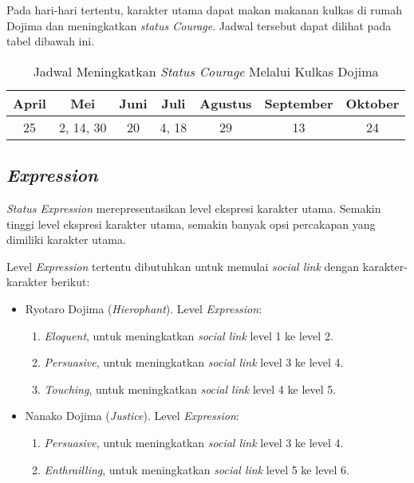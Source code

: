 Pada hari-hari tertentu, karakter utama dapat makan makanan kulkas di rumah Dojima dan meningkatkan \textit{status Courage}. Jadwal tersebut dapat dilihat pada tabel dibawah ini.
\begin{table}[htb]
    \begin{center}
        \begin{tabular}{ | c | c | c | c | c | c | c | }
            \hline
            April & Mei       & Juni & Juli  & Agustus & September & Oktober \\
            \hline
            25    & 2, 14, 30 & 20   & 4, 18 & 29      & 13        & 24      \\
            \hline
        \end{tabular}
    \end{center}
    \caption{\label{jadwal1}Jadwal Meningkatkan \textit{Status Courage} Melalui Kulkas Dojima}
\end{table}

\subsection{\textit{Expression}}
\textit{Status Expression} merepresentasikan level ekspresi karakter utama. Semakin tinggi level ekspresi karakter utama, semakin banyak opsi percakapan yang dimiliki karakter utama.

Level \textit{Expression} tertentu dibutuhkan untuk memulai \textit{social link} dengan karakter-karakter berikut:
\begin{itemize}
    \item{Ryotaro Dojima (\textit{Hierophant}). Level \textit{Expression}:
                \begin{enumerate}
                    \item \textit{Eloquent}, untuk meningkatkan \textit{social link} level 1 ke level 2.
                    \item \textit{Persuasive}, untuk meningkatkan \textit{social link} level 3 ke level 4.
                    \item \textit{Touching}, untuk meningkatkan \textit{social link} level 4 ke level 5.
                \end{enumerate}
          }
    \item{Nanako Dojima (\textit{Justice}).
                Level \textit{Expression}:
                \begin{enumerate}
                    \item \textit{Persuasive}, untuk meningkatkan \textit{social link} level 3 ke level 4.
                    \item \textit{Enthrailling}, untuk meningkatkan \textit{social link} level 5 ke level 6.
                \end{enumerate}
          }
\end{itemize}

